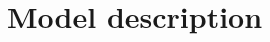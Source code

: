 \documentclass[final,3p,times,authoryear]{elsarticle}
\begin{document}

\section{Model description}\label{sec:ModelDescription}
\end{document}
